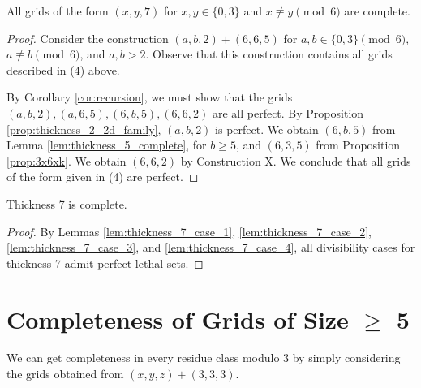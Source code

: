 \begin{lem}
\label{lem:thickness_7_case_4}
All grids of the form $(x,y,7)$ for $x,y \in \{0,3\}$ and $x \not\equiv y \pmod 6$ are complete.
\end{lem}

\begin{proof}
Consider the construction $(a,b,2) + (6,6,5)$ for $a,b \in \{0,3\} \pmod 6$, $a \not\equiv b \pmod 6$, and $a,b > 2$. Observe that this construction contains all grids described in (4) above. 

By Corollary \ref{cor:recursion}, we must show that the grids $(a,b,2), (a,6,5), (6,b,5), (6,6,2)$ are all perfect. By Proposition \ref{prop:thickness_2_2d_family}, $(a,b,2)$ is perfect. We obtain $(6,b,5)$ from Lemma \ref{lem:thickness_5_complete}, for $b \geq 5$, and $(6,3,5)$ from Proposition \ref{prop:3x6xk}. We obtain $(6,6,2)$ by Construction X. We conclude that all grids of the form given in (4) are perfect.
\end{proof}

\begin{lem}
Thickness 7 is complete.
\end{lem}

\begin{proof}
By Lemmas \ref{lem:thickness_7_case_1}, \ref{lem:thickness_7_case_2}, \ref{lem:thickness_7_case_3}, and \ref{lem:thickness_7_case_4}, all divisibility cases for thickness 7 admit perfect lethal sets.
\end{proof}

\section{Completeness of Grids of Size $\geq$ 5}

We can get completeness in every residue class modulo 3 by simply considering the grids obtained from $(x,y,z)+(3,3,3)$.



